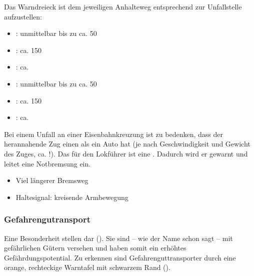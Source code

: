 {
Das Warndreieck ist
dem jeweiligen Anhalteweg entsprechend zur Unfallstelle
aufzustellen:
\begin{itemize}
  \item {}: unmittelbar bis zu ca. 50\Meter*
  \item {}: ca. 150\Meter*
  \item {}: ca. \Meter*
\end{itemize}
}{
\begin{itemize}
  \item {}: unmittelbar bis zu ca. 50\Meter*
  \item {}: ca. 150\Meter*
  \item {}: ca. \Meter*
\end{itemize}
}{}{}{}

{
Bei einem Unfall an einer Eisenbahnkreuzung ist zu bedenken, dass der
herannahende Zug einen  als ein
Auto hat (je nach Geschwindigkeit und
Gewicht des Zuges, ca. \Meter*!). Das
 für den Lokführer ist eine . 
Dadurch wird er gewarnt und leitet 
eine Notbremsung ein.
}{
\begin{itemize}
  \item Viel längerer Bremsweg
  \item Haltesignal: kreisende Armbewegung
\end{itemize}
}{}{}{}



\subsubsection{Gefahrengutransport}

Eine Besonderheit stellen  dar
(). Sie sind -- wie der Name
schon sagt -- mit gefährlichen Gütern versehen und haben
somit ein erhöhtes Gefährdungspotential. Zu erkennen sind
Gefahrenguttransporter durch eine orange, rechteckige
Warntafel mit schwarzem Rand
().

